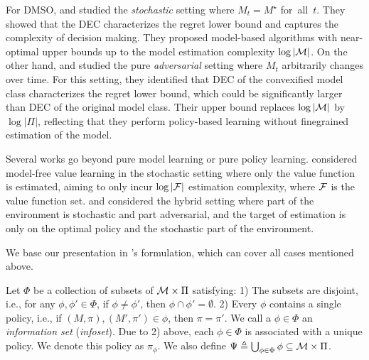For DMSO, \cite{foster2021statistical, foster2023tight} and \cite{chen2022unified} studied the \emph{stochastic} setting where $M_t=M^\star$ for~all~$t$. They showed that the DEC characterizes the regret lower bound and captures the complexity of decision making. They proposed model-based algorithms with near-optimal upper bounds up to the model estimation complexity $\log|\mathcal{M}|$. 
On the other hand, \cite{foster2022complexity} and \cite{xu2023bayesian} studied the pure \emph{adversarial} setting where $M_t$ arbitrarily changes over time. For this setting, they identified that DEC of the convexified model class characterizes the regret lower bound, which could be significantly larger than DEC of the original model class. Their upper bound replaces $\log|\mathcal{M}|$ by $\log|\Pi|$, reflecting that they perform policy-based learning without finegrained estimation of the model. 

Several works go beyond pure model learning or pure policy learning. \cite{foster2024model} considered model-free value learning in the stochastic setting where only the value function is estimated, aiming to only incur $\log|\mathcal{F}|$ estimation complexity, where $\mathcal{F}$ is the value function set.  \cite{liu2025decision} and \cite{chen2025decision} considered the hybrid setting where part of the environment is stochastic and part adversarial, and the target of estimation is only on the optimal policy and the stochastic part of the environment. 

We base our presentation in \cite{liu2025decision}'s formulation, which can cover all cases mentioned above. 
\begin{definition}\label{def: infoset}
   Let $\Phi$ be a collection of subsets of $\mathcal{M}\times\Pi$ satisfying: 1) The subsets are disjoint, i.e., for any $\phi, \phi'\in \Phi$, if $\phi\neq \phi'$, then $\phi\cap \phi'=\emptyset$. 2) Every $\phi$ contains a single policy, i.e., if $(M,\pi), (M', \pi')\in \phi$, then $\pi=\pi'$.
   We call a $\phi\in\Phi$ an \emph{information set} (\emph{infoset}). 
   Due to 2) above, each $\phi\in\Phi$ is associated with a unique policy. We denote this policy as $\pi_\phi$. We also define $\Psi \triangleq \bigcup_{\phi \in \Phi} \phi \subseteq \mathcal{M} \times \Pi$. 
\end{definition}

